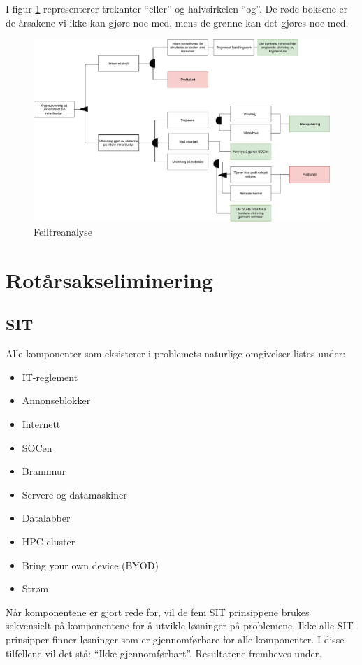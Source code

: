 I figur \ref{fig:feil_tre_analyse} representerer trekanter ``eller'' og halvsirkelen ``og''. De røde boksene er de årsakene vi ikke kan gjøre noe med, mens de grønne kan det gjøres noe med.
 \begin{figure}[H]
    \centering
    \includegraphics[scale=0.45]{case_3/bilder/feil_tre_analyse.pdf}
    \caption{Feiltreanalyse}
    \label{fig:feil_tre_analyse}
\end{figure}
\section{Rotårsakseliminering}
\subsection{SIT}
Alle komponenter som eksisterer i problemets naturlige omgivelser listes under:

\begin{itemize}
    \item IT-reglement
    \item Annonseblokker
    \item Internett
    \item SOCen
    \item Brannmur
    \item Servere og datamaskiner
    \item Datalabber
    \item HPC-cluster
    \item Bring your own device (BYOD)
    \item Strøm
\end{itemize}

Når komponentene er gjort rede for, vil de fem SIT prinsippene brukes sekvensielt på komponentene for å utvikle løsninger på problemene. Ikke alle SIT-prinsipper finner løsninger som er gjennomførbare for alle komponenter. I disse tilfellene vil det stå: ``Ikke gjennomførbart''. Resultatene fremheves under.

